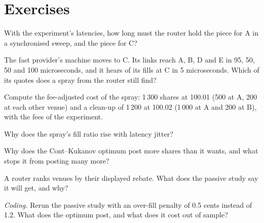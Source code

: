 \section{Exercises}

\begin{exercise}[$\star$]\label{exo:mx:smart-order-routing:1}
With the experiment's latencies, how long must the router hold the piece for A in a synchronised sweep, and the piece for C?
\end{exercise}

\begin{exercise}[$\star$]\label{exo:mx:smart-order-routing:2}
The fast provider's machine moves to C. Its links reach A, B, D and E in 95, 50, 50 and 100 microseconds, and it hears of its fills at C in
5 microseconds. Which of its quotes does a spray from the router still find?
\end{exercise}

\begin{exercise}[$\star$]\label{exo:mx:smart-order-routing:3}
Compute the fee-adjusted cost of the spray: 1\,300 shares at 100.01 (500 at A, 200 at each other venue) and a clean-up of 1\,200 at 100.02 (1\,000
at A and 200 at B), with the fees of the experiment.
\end{exercise}

\begin{exercise}[$\star\star$]\label{exo:mx:smart-order-routing:4}
Why does the spray's fill ratio rise with latency jitter?
\end{exercise}

\begin{exercise}[$\star\star$]\label{exo:mx:smart-order-routing:5}
Why does the Cont--Kukanov optimum post more shares than it wants, and what stops it from posting many more?
\end{exercise}

\begin{exercise}[$\star\star$]\label{exo:mx:smart-order-routing:6}
A router ranks venues by their displayed rebate. What does the passive study say it will get, and why?
\end{exercise}

\begin{exercise}[$\star\star\star$]\label{exo:mx:smart-order-routing:7}
\emph{Coding.} Rerun the passive study with an over-fill penalty of 0.5 cents instead of 1.2. What does the optimum post, and what does it cost out of
sample?
\end{exercise}

